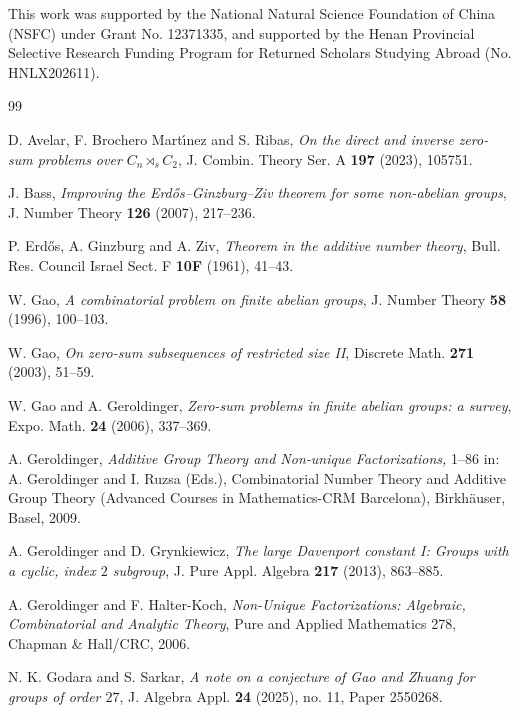 \documentclass[a4paper, 12pt]{article}
\theoremstyle{definition}
\begin{document}

\noindent
This work was supported by the National Natural Science Foundation of
China (NSFC) under Grant No. 12371335, and supported by the Henan
Provincial Selective Research Funding Program for Returned Scholars
Studying Abroad (No. HNLX202611).

\begin{thebibliography}{99}


D. Avelar, F. Brochero Mart\'{\i}nez and S. Ribas,
\emph{On the direct and inverse zero-sum problems over
$C_n\rtimes_s C_2$},
J. Combin. Theory Ser. A \textbf{197} (2023), 105751.


J. Bass,
\emph{Improving the Erd\H{o}s--Ginzburg--Ziv theorem for some
non-abelian groups},
J. Number Theory \textbf{126} (2007), 217--236.

P. Erd\H{o}s, A. Ginzburg and A. Ziv,
\emph{Theorem in the additive number theory},
Bull. Res. Council Israel Sect. F \textbf{10F} (1961), 41--43.

W. Gao,
\emph{A combinatorial problem on finite abelian groups},
J. Number Theory \textbf{58} (1996), 100--103.

W. Gao,
\emph{On zero-sum subsequences of restricted size II},
Discrete Math. \textbf{271} (2003), 51--59.

W. Gao and A. Geroldinger,
\emph{Zero-sum problems in finite abelian groups: a survey},
Expo. Math. \textbf{24} (2006), 337--369.

 A. Geroldinger, \emph{Additive Group Theory and Non-unique Factorizations,} 1--86 in: A. Geroldinger and I. Ruzsa (Eds.), Combinatorial Number
Theory and Additive Group Theory (Advanced Courses in Mathematics-CRM Barcelona), Birkh\"{a}user, Basel, 2009.


A. Geroldinger and D. Grynkiewicz,
\emph{The large Davenport constant I: Groups with a cyclic, index $2$ subgroup},
J. Pure Appl. Algebra \textbf{217} (2013), 863--885.

A. Geroldinger and F. Halter-Koch,
\emph{Non-Unique Factorizations: Algebraic, Combinatorial and
Analytic Theory},
Pure and Applied Mathematics 278, Chapman \& Hall/CRC, 2006.

N. K. Godara and S. Sarkar,
\emph{A note on a conjecture of Gao and Zhuang for groups of order $27$},
J. Algebra Appl. \textbf{24} (2025), no. 11, Paper 2550268.



\end{thebibliography}
\end{document}

